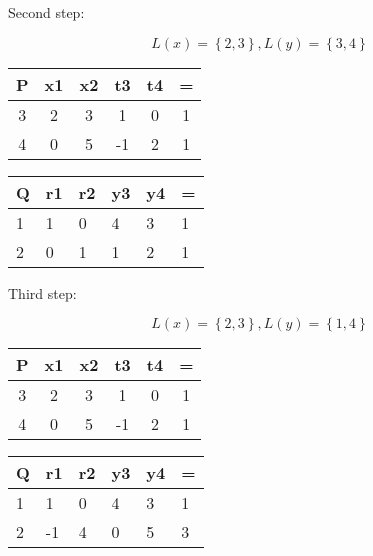 \documentclass{article}
\newenvironment{answer}{\par\color{ForestGreen}}{\par}
\begin{document}
\begin{enumerate}
\begin{answer}
Second step:

$$L(x)=\left\{2,3\right\}, L(y)=\left\{3,4\right\}$$
\begin{table}[!htb]
\begin{answer}
\begin{minipage}[t]{.5\textwidth}
\centering
\begin{tabular}[t]{cccccc}
  \toprule
  P & x1 & x2 & t3 & t4 & = \\
  \midrule
  3 & 2 & 3 & 1 & 0 & 1 \\
  \hline
  4 & 0 & 5 & -1 & 2 & 1 \\
  \bottomrule
\end{tabular}
\end{minipage}
\begin{minipage}[t]{0.5\textwidth}
\centering
\begin{tabular}[t]{llllll}
  \toprule
  Q & r1 & r2 & y3 & y4 & = \\
  \midrule
  1 & 1 & 0 & 4 & 3 & 1 \\
  \hline
  2 & 0 & 1 & 1 & 2 & 1 \\
  \bottomrule
\end{tabular}
\end{minipage}
\end{answer}
\end{table}

Third step:

$$L(x)=\left\{2,3\right\}, L(y)=\left\{1,4\right\}$$
\begin{table}[!htb]
\begin{answer}
\begin{minipage}[t]{.5\textwidth}
\centering
\begin{tabular}[t]{cccccc}
  \toprule
  P & x1 & x2 & t3 & t4 & = \\
  \midrule
  3 & 2 & 3 & 1 & 0 & 1 \\
  \hline
  4 & 0 & 5 & -1 & 2 & 1 \\
  \bottomrule
\end{tabular}
\end{minipage}
\begin{minipage}[t]{0.5\textwidth}
\centering
\begin{tabular}[t]{llllll}
  \toprule
  Q & r1 & r2 & y3 & y4 & = \\
  \midrule
  1 & 1 & 0 & 4 & 3 & 1 \\
  \hline
  2 & -1 & 4 & 0 &5 & 3 \\
  \bottomrule
\end{tabular}
\end{minipage}
\end{answer}
\end{table}


\end{answer}
\end{enumerate}
\end{document}
